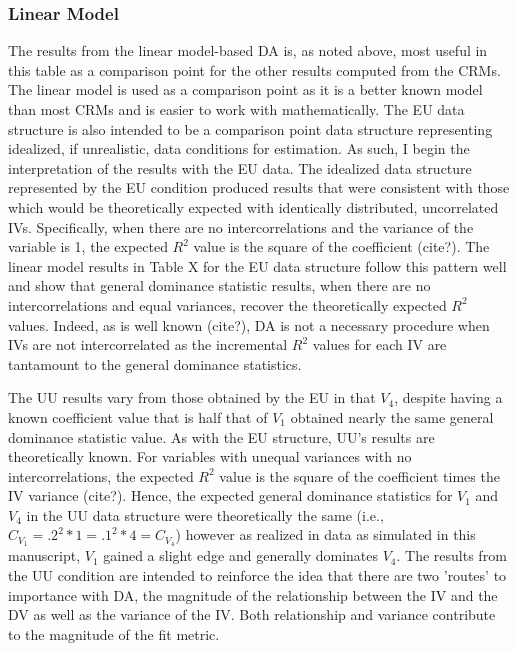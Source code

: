 \documentclass[ShortAfour,times,sageapa]{sagej}
\begin{document}
		\subsubsection{Linear Model}
	The results from the linear model-based DA is, as noted above, most useful in this table as a comparison point for the other results computed from the CRMs.
	The linear model is used as a comparison point as it is a better known model than most CRMs and is easier to work with mathematically.
	The EU data structure is also intended to be a comparison point data structure representing idealized, if unrealistic, data conditions for estimation.
	As such, I begin the interpretation of the results with the EU data.	
	The idealized data structure represented by the EU condition produced results that were consistent with those which would be theoretically expected with identically distributed, uncorrelated IVs.  
	Specifically, when there are no intercorrelations and the variance of the variable is 1, the expected $R^2$ value is the square of the coefficient (cite?).
	The linear model results in Table X for the EU data structure follow this pattern well and show that general dominance statistic results, when there are no intercorrelations and equal variances, recover the theoretically expected $R^2$ values.  
	Indeed, as is well known (cite?), DA is not a necessary procedure when IVs are not intercorrelated as the incremental $R^2$ values for each IV are tantamount to the general dominance statistics.
	
	
	The UU results vary from those obtained by the EU in that $V_4$, despite having a known coefficient value that is half that of $V_1$ obtained nearly the same general dominance statistic value.
	As with the EU structure, UU's results are theoretically known.
	For variables with unequal variances with no intercorrelations, the expected $R^2$ value is the square of the coefficient times the IV variance (cite?).
	Hence, the expected general dominance statistics for $V_1$ and $V_4$ in the UU data structure were theoretically the same (i.e., $C_{V_1} = .2^2*1 = .1^2*4 = C_{V_4}$) however as realized in data as simulated in this manuscript, $V_1$ gained a slight edge and generally dominates $V_4$.
	The results from the UU condition are intended to reinforce the idea that there are two 'routes' to importance with DA, the magnitude of the relationship between the IV and the DV as well as the variance of the IV.
	Both relationship and variance contribute to the magnitude of the fit metric.
	
\end{document}
